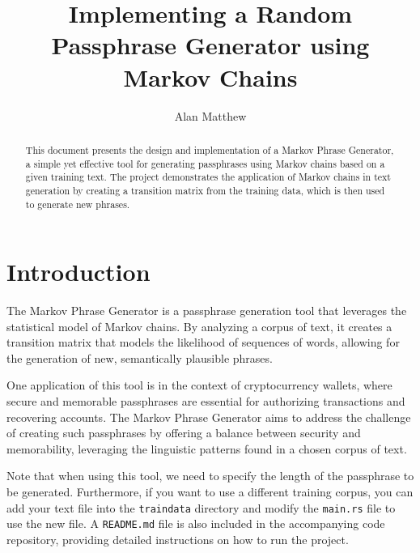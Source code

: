 \documentclass[a4paper,12pt]{article}
\begin{document}
\title{Implementing a Random Passphrase Generator using Markov Chains}
\author{Alan Matthew}
\date{}
\maketitle

\begin{abstract}
This document presents the design and implementation of a Markov Phrase Generator, a simple yet effective tool for generating passphrases using Markov chains based on a given training text. The project demonstrates the application of Markov chains in text generation by creating a transition matrix from the training data, which is then used to generate new phrases.
\end{abstract}

\pagestyle{fancy}
\fancyhead{}
\fancyfoot{}
\fancyfoot[C]{\thepage}

\newpage
\tableofcontents
\newpage

\section{Introduction}
The Markov Phrase Generator is a passphrase generation tool that leverages the statistical model of Markov chains. By analyzing a corpus of text, it creates a transition matrix that models the likelihood of sequences of words, allowing for the generation of new, semantically plausible phrases.

One application of this tool is in the context of cryptocurrency wallets, where secure and memorable passphrases are essential for authorizing transactions and recovering accounts. The Markov Phrase Generator aims to address the challenge of creating such passphrases by offering a balance between security and memorability, leveraging the linguistic patterns found in a chosen corpus of text.

Note that when using this tool, we need to specify the length of the passphrase to be generated. Furthermore, if you want to use a different training corpus, you can add your text file into the \texttt{traindata} directory and modify the \texttt{main.rs} file to use the new file. A \texttt{README.md} file is also included in the accompanying code repository, providing detailed instructions on how to run the project.
\end{document}
